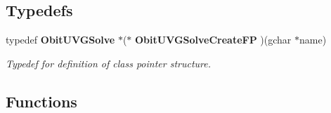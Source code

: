 \subsection*{Typedefs}
\begin{CompactItemize}
\item 
typedef {\bf Obit\-UVGSolve} $\ast$($\ast$ {\bf Obit\-UVGSolve\-Create\-FP} )(gchar $\ast$name)
\begin{CompactList}\small\item\em Typedef for definition of class pointer structure. \item\end{CompactList}\end{CompactItemize}
\subsection*{Functions}
